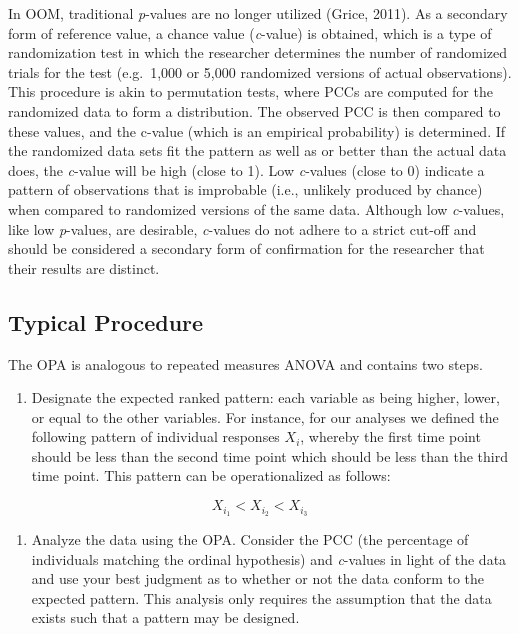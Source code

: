 \documentclass[english,man]{apa6}
\providecommand{\tightlist}{%
  \setlength{\itemsep}{0pt}\setlength{\parskip}{0pt}}
\theoremstyle{definition}
\theoremstyle{definition}
\theoremstyle{definition}
\theoremstyle{remark}
\begin{document}
In OOM, traditional \emph{p}-values are no longer utilized (Grice,
2011). As a secondary form of reference value, a chance value
(\emph{c}-value) is obtained, which is a type of randomization test in
which the researcher determines the number of randomized trials for the
test (e.g.~1,000 or 5,000 randomized versions of actual observations).
This procedure is akin to permutation tests, where PCCs are computed for
the randomized data to form a distribution. The observed PCC is then
compared to these values, and the c-value (which is an empirical
probability) is determined. If the randomized data sets fit the pattern
as well as or better than the actual data does, the \emph{c}-value will
be high (close to 1). Low \emph{c}-values (close to 0) indicate a
pattern of observations that is improbable (i.e., unlikely produced by
chance) when compared to randomized versions of the same data. Although
low \emph{c}-values, like low \emph{p}-values, are desirable,
\emph{c}-values do not adhere to a strict cut-off and should be
considered a secondary form of confirmation for the researcher that
their results are distinct.

\subsection{Typical Procedure}\label{typical-procedure}

The OPA is analogous to repeated measures ANOVA and contains two steps.

\begin{enumerate}
\def\labelenumi{\arabic{enumi})}
\tightlist
\item
  Designate the expected ranked pattern: each variable as being higher,
  lower, or equal to the other variables. For instance, for our analyses
  we defined the following pattern of individual responses \(X_i\),
  whereby the first time point should be less than the second time point
  which should be less than the third time point. This pattern can be
  operationalized as follows:
\end{enumerate}

\[
  X_{i_1} < X_{i_2} < X_{i_3}   
\]

\begin{enumerate}
\def\labelenumi{\arabic{enumi})}
\setcounter{enumi}{1}
\tightlist
\item
  Analyze the data using the OPA. Consider the PCC (the percentage of
  individuals matching the ordinal hypothesis) and \emph{c}-values in
  light of the data and use your best judgment as to whether or not the
  data conform to the expected pattern. This analysis only requires the
  assumption that the data exists such that a pattern may be designed.
\end{enumerate}
\end{document}
